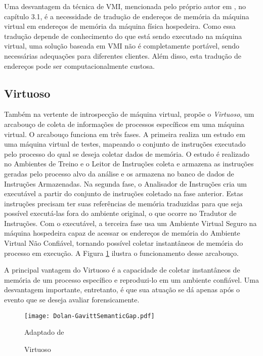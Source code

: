 Uma desvantagem da técnica de VMI, mencionada pelo próprio autor em \cite{PoiselVMI:2013}, no capítulo 3.1, é a necessidade de tradução de endereços de memória da máquina virtual em endereços de memória da máquina física hospedeira.
%
Como essa tradução depende de conhecimento do que está sendo executado na máquina virtual, uma solução baseada em VMI não é completamente portável, sendo necessárias adequações para diferentes clientes.
%
Além disso, esta tradução de endereços pode ser computacionalmente custosa.%
%

\subsection{Virtuoso}
\label{sec:virtuoso}

Também na vertente de introspecção de máquina virtual, \cite{Dolan-GavittSemanticGap:2011} propõe o \textit{Virtuoso}, um arcabouço de coleta de informações de processos específicos em uma máquina virtual.
%
O arcabouço funciona em três fases.
%
A primeira realiza um estudo em uma máquina virtual de testes, mapeando o conjunto de instruções executado pelo processo do qual se deseja coletar dados de memória. 
%
O estudo é realizado no Ambientes de Treino e o Leitor de Instruções coleta e armazena as instruções geradas pelo processo alvo da análise e os armazena no banco de dados de Instruções Armazenadas.
%
Na segunda fase, o Analisador de Instruções cria um executável a partir do conjunto de instruções coletado na fase anterior. Estas instruções precisam ter suas referências de memória traduzidas para que seja possível executá-las fora do ambiente original, o que ocorre no Tradutor de Instruções.
%
Com o executável, a terceira fase usa um Ambiente Virtual Seguro na máquina hospedeira capaz de acessar os endereços de memória do Ambiente Virtual Não Confiável, tornando possível coletar instantâneos de memória do processo em execução.
%
A Figura \ref{fig:Dolan-GavittSemanticGap} ilustra o funcionamento desse arcabouço. 


A principal vantagem do Virtuoso é a capacidade de coletar instantâneos de memória de um processo específico e reproduzi-lo em um ambiente confiável.
%
Uma desvantagem importante, entretanto, é que sua atuação se dá apenas após o evento que se deseja avaliar forensicamente.
%


\begin{figure}[htb!]
\footnotesize
\caption{Virtuoso}
\texttt{[image: Dolan-GavittSemanticGap.pdf]}
\centering
\label{fig:Dolan-GavittSemanticGap}
\begin{center}
Adaptado de \cite{Dolan-GavittSemanticGap:2011} 
\end{center}
\end{figure}



